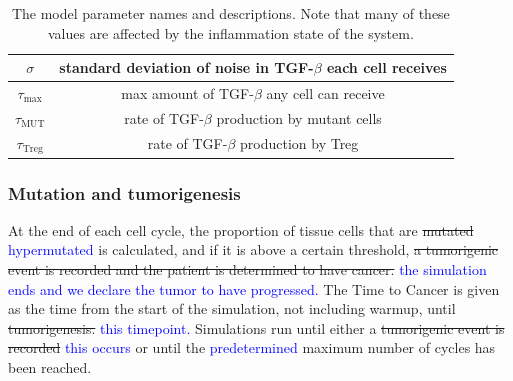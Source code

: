 \documentclass[11pt]{article}
\newcommand{\tcb} { \textcolor{blue} }
\begin{document}
\begin{table}[H]
\begin{center}
\begin{tabular}{|| c | c||}
  \hline
  $\sigma$ & standard deviation of noise in TGF-$\beta$ each cell receives  \\
  \hline
 $\tau_\text{max}$ & max amount of TGF-$\beta$ any cell can receive \\
  \hline 
 $\tau_\text{MUT}$ & rate of TGF-$\beta$ production by mutant cells\\
  \hline
 $\tau_\text{Treg}$ & rate of TGF-$\beta$ production by Treg\\
  \hline
\end{tabular}
  \caption{The model parameter names and descriptions. Note that many of these values are affected by the inflammation state of the system.}
\end{center}
\end{table}

\subsubsection{Mutation and tumorigenesis}
At the end of each cell cycle, the proportion of tissue cells that are \sout{mutated} \tcb{hypermutated} is calculated, and if it is above a certain threshold, \sout{a tumorigenic event is recorded and the patient is determined to have cancer.}
\tcb{the simulation ends and we declare the tumor to have progressed.}
The Time to Cancer is given as the time from the start of the simulation, not including warmup, until \sout{tumorigenesis.} \tcb{this timepoint.}
Simulations run until either a \sout{tumorigenic event is recorded} \tcb{this occurs} or until the \tcb{predetermined} maximum number of cycles has been reached.
\end{document}
